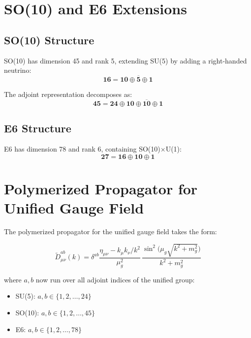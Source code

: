\documentclass[11pt]{article}
\begin{document}
\section{SO(10) and E6 Extensions}

\subsection{SO(10) Structure}
SO(10) has dimension 45 and rank 5, extending SU(5) by adding a right-handed neutrino:
\begin{equation}
    \mathbf{16} = \mathbf{10} \oplus \mathbf{\overline{5}} \oplus \mathbf{1}
\end{equation}

The adjoint representation decomposes as:
\begin{equation}
    \mathbf{45} = \mathbf{24} \oplus \mathbf{10} \oplus \mathbf{\overline{10}} \oplus \mathbf{1}
\end{equation}

\subsection{E6 Structure}
E6 has dimension 78 and rank 6, containing SO(10)$\times$U(1):
\begin{equation}
    \mathbf{27} = \mathbf{16} \oplus \mathbf{10} \oplus \mathbf{1}
\end{equation}

\section{Polymerized Propagator for Unified Gauge Field}

The polymerized propagator for the unified gauge field takes the form:

\begin{equation}
  \boxed{
  \tilde{D}^{ab}_{\mu\nu}(k) = \delta^{ab}\frac{\eta_{\mu\nu}-k_\mu k_\nu/k^2}{\mu_g^2}\, \frac{\sin^2\!\bigl(\mu_g\sqrt{k^2+m_g^2}\bigr)}{k^2+m_g^2}
  }
\end{equation}

where $a,b$ now run over all adjoint indices of the unified group:
\begin{itemize}
    \item SU(5): $a,b \in \{1,2,\ldots,24\}$
    \item SO(10): $a,b \in \{1,2,\ldots,45\}$
    \item E6: $a,b \in \{1,2,\ldots,78\}$
\end{itemize}
\end{document}
